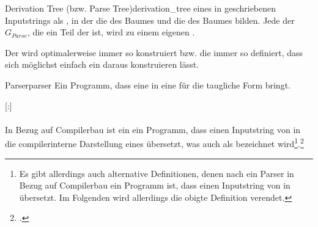 \begin{Definition}{Derivation Tree (bzw. Parse Tree)}{derivation_tree}
   eines in  geschriebenen Inputstrings als , in der  die  des Baumes und  die  des Baumes bilden. Jede  der  $G_{Parse}$, die ein Teil der  ist,  wird zu einem eigenen .

  Der  wird optimalerweise immer so konstruiert bzw. die  immer so definiert, dass sich möglichst einfach ein  daraus konstruieren lässt.

\end{Definition}

\begin{Definition}{Parser}{parser}
  Ein Programm, dass eine  in eine für die  taugliche Form bringt.

  \setcounter{subdefcounter}{1}

  \titleformat{\paragraph}[runin]{\normalfont\normalsize\bfseries}{}{0mm}{}[:]

  \paragraph{\thesubdefcounter}\label{par:parser}\hspace{-0.25cm}
  In Bezug auf Compilerbau ist ein  ein Programm, dass einen Inputstring von  in die compilerinterne Darstellung eines  übersetzt, was auch als   bezeichnet wird\footnote{Es gibt allerdings auch alternative Definitionen, denen nach ein Parser in Bezug auf Compilerbau ein Programm ist, dass einen Inputstring von  in   übersetzt. Im Folgenden wird allerdings die obigte Definition  verendet.}.\footcite{noauthor_compiler_nodate}
\end{Definition}

